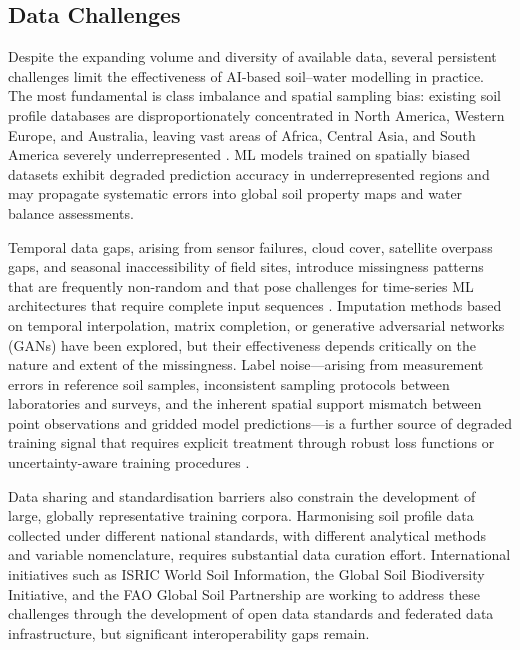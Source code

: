 \documentclass[land,article,submit,pdftex,moreauthors]{Definitions/mdpi}
\numberwithin{equation}{section}
\begin{document}
\subsection{Data Challenges}

Despite the expanding volume and diversity of available data, several persistent challenges limit the effectiveness of AI-based soil--water modelling in practice. The most fundamental is class imbalance and spatial sampling bias: existing soil profile databases are disproportionately concentrated in North America, Western Europe, and Australia, leaving vast areas of Africa, Central Asia, and South America severely underrepresented \citep{hengl2017soilgrids250m}. ML models trained on spatially biased datasets exhibit degraded prediction accuracy in underrepresented regions and may propagate systematic errors into global soil property maps and water balance assessments.

Temporal data gaps, arising from sensor failures, cloud cover, satellite overpass gaps, and seasonal inaccessibility of field sites, introduce missingness patterns that are frequently non-random and that pose challenges for time-series ML architectures that require complete input sequences \citep{gruber2020}. Imputation methods based on temporal interpolation, matrix completion, or generative adversarial networks (GANs) have been explored, but their effectiveness depends critically on the nature and extent of the missingness. Label noise---arising from measurement errors in reference soil samples, inconsistent sampling protocols between laboratories and surveys, and the inherent spatial support mismatch between point observations and gridded model predictions---is a further source of degraded training signal that requires explicit treatment through robust loss functions or uncertainty-aware training procedures \citep{yang2023physics}.

Data sharing and standardisation barriers also constrain the development of large, globally representative training corpora. Harmonising soil profile data collected under different national standards, with different analytical methods and variable nomenclature, requires substantial data curation effort. International initiatives such as ISRIC World Soil Information, the Global Soil Biodiversity Initiative, and the FAO Global Soil Partnership are working to address these challenges through the development of open data standards and federated data infrastructure, but significant interoperability gaps remain.
\end{document}
